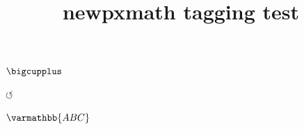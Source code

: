 \documentclass{article}
\title{newpxmath tagging test}
\begin{document}
\checkmark

\circledR

\maltese

\textsquare

$\bigcupplus$

$\circlearrowleft$

$\varmathbb{ABC}$
\end{document}
